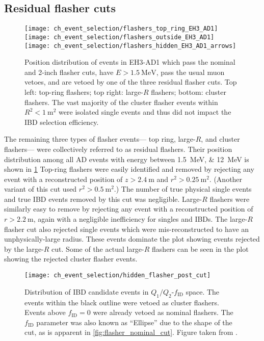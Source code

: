 \subsection{Residual flasher cuts}
\label{subsec:flash_resid}

\begin{figure}
    \centering
    \texttt{[image: ch\_event\_selection/flashers\_top\_ring\_EH3\_AD1]}
    \texttt{[image: ch\_event\_selection/flashers\_outside\_EH3\_AD1]}\\
    \texttt{[image: ch\_event\_selection/flashers\_hidden\_EH3\_AD1\_arrows]}
    \caption[Residual flasher position distributions]{
        Position distribution of events in EH3-AD1
        which pass the nominal and 2-inch flasher cuts,
        have $E > \SI{1.5}{\MeV}$, pass the usual muon vetoes,
        and are vetoed by one of the three residual flasher cuts.
        Top left: top-ring flashers;
        top right: large-$R$ flashers;
        bottom: cluster flashers.
        The vast majority of the cluster flasher events
        within $R^2 < \SI{1}{\m\squared}$
        were isolated single events
        and thus did not impact the IBD selection efficiency.
    }
    \label{fig:flasher_resid_pos}
\end{figure}

The remaining three types of flasher events---%
top ring, large-$R$, and cluster flashers---%
were collectively referred to as residual flashers.
Their position distribution among all AD events
with energy between \SIlist{1.5;12}{\MeV}
is shown in \cref{fig:flasher_resid_pos}
Top-ring flashers were easily identified and removed
by rejecting any event with a reconstructed position
of $z > \SI{2.4}{\m}$ and $r^2 > \SI{0.25}{\m\squared}$.
(Another variant of this cut used $r^2 > \SI{0.5}{\m\squared}$.)
The number of true physical single events and
true IBD events removed by this cut was negligible.
Large-$R$ flashers were similarly easy to remove
by rejecting any event with a reconstructed position
of $r > \SI{2.2}{\m}$,
again with a negligible inefficiency for singles and IBDs.
The large-$R$ flasher cut also rejected
single events which were mis-reconstructed to have an unphysically-large radius.
These events dominate the plot showing events rejected by the large-$R$ cut.
Some of the actual large-$R$ flashers can be seen in the plot
showing the rejected cluster flasher events.

\begin{figure}
    \centering
    \texttt{[image: ch\_event\_selection/hidden\_flasher\_post\_cut]}
    \caption[Cluster flasher variables]{
        Distribution of IBD candidate events in $Q_1/Q_2$-$f_{\text{ID}}$ space.
        The events within the black outline were vetoed as
        cluster flashers.
        Events above $f_{\text{ID}}=0$ were already vetoed as nominal flashers.
        The $f_\text{ID}$ parameter was also known as ``Ellipse''
        due to the shape of the cut, as is apparent in \cref{fig:flasher_nominal_cut}.
        Figure taken from \cite{flasher_plots}.
    }
    \label{fig:hidden_flasher_cut}
\end{figure}

